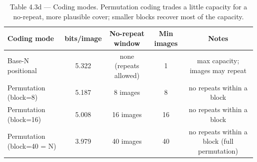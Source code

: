 \begin{table}[htbp]
\centering
\caption{Table 4.3d — Coding modes. Permutation coding trades a little capacity for a no-repeat, more plausible cover; smaller blocks recover most of the capacity.}
\label{tab:table_4_3_coding_modes}
\begin{tabular}{lcccc}
\hline
Coding mode & bits/image & No-repeat window & Min images & Notes \\
\hline
Base-N positional & 5.322 & none (repeats allowed) & 1 & max capacity; images may repeat \\
Permutation (block=8) & 5.187 & 8 images & 8 & no repeats within a block \\
Permutation (block=16) & 5.008 & 16 images & 16 & no repeats within a block \\
Permutation (block=40 = N) & 3.979 & 40 images & 40 & no repeats within a block (full permutation) \\
\hline
\end{tabular}
\end{table}

